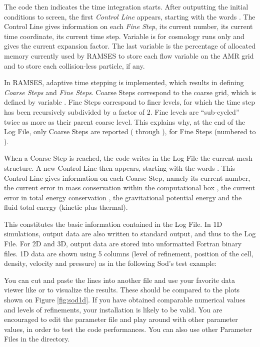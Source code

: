 The code then indicates the time integration starts. After outputting
the initial conditions to screen, the first \emph{Control Line} appears,
starting with the words . The Control Line gives
information on each \emph{Fine Step}, its current number, its current
time coordinate, its current time step. Variable  is for
cosmology runs only and gives the current expansion factor. The last
variable is the percentage of allocated memory currently used by RAMSES
to store each flow variable on the AMR grid and to store each
collision-less particle, if any.

In RAMSES, adaptive time stepping is implemented, which results in defining
\emph{Coarse Steps} and \emph{Fine Steps}. Coarse Steps correspond to the
coarse grid, which is defined by variable . Fine Steps correspond
to finer levels, for which the time step has been recursively subdivided by a
factor of 2. Fine levels are ``sub-cycled'' twice as more as their parent
coarse level. This explains why, at the end of the Log File, only
{\coarsestepcount} Coarse Steps are reported ({\coarsestepfirst} through
{\coarsesteplast}), for {\finestepcount} Fine Steps (numbered {\finestepfirst}
to {\finesteplast}).

When a Coarse Step is reached, the code writes in the Log File the
current mesh structure. A new Control Line then appears, starting with
the words . This Control Line gives information on each
Coarse Step, namely its current number, the current error in mass
conservation within the computational box , the current
error in total energy conservation , the gravitational
potential energy and the fluid total energy (kinetic plus thermal).

This constitutes the basic information contained in the Log File. In 1D
simulations, output data are also written to standard output, and thus to the
Log File. For 2D and 3D, output data are stored into unformatted Fortran binary
files.  1D data are shown using 5 columns (level of refinement, position of the
cell, density, velocity and pressure) as in the following Sod's test example:


You can cut and paste the {\lastoutputncells} lines into another file and use
your favorite data viewer like  or  to visualize the
results.  These should be compared to the plots shown on Figure
\ref{fig:sod1d}. If you have obtained comparable numerical values and levels of
refinements, your installation is likely to be valid. You are encouraged to
edit the parameter file \cmd{\logfilename} and play around with other parameter
values, in order to test the code performances. You can also use other
Parameter Files in the  directory.

